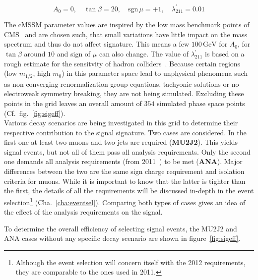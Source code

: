 \begin{equation*}
  A_0 = 0, \quad \tan{\beta} = 20, \quad \text{sgn}\,\mu = +1, \quad \lambda^\prime_{211} = 0.01
\end{equation*}

The cMSSM parameter values are inspired by the low mass benchmark points of CMS~\cite{cmssusybenchmarkpoints} and are chosen such, that small variations have little impact on the mass spectrum and thus do not affect signature. This means a few $100\,\text{GeV}$ for $A_0$, for $\tan{\beta}$ around $10$ and sign of $\mu$ can also change. The value of $\lambda^\prime_{211}$ is based on a rough estimate for the sensitvity of hadron colliders~\cite{rpvimpl}. Because certain regions (low $m_{1/2}$, high $m_0$) in this parameter space lead to unphysical phenomena such as non-converging renormalization group equations, tachyonic solutions or no electroweak symmetry breaking, they are not being simulated. Excluding these points in the grid leaves an overall amount of $354$ simulated phase space points (Cf.~fig.~\ref{fig:sigeff}). \\

Various decay scenarios are being investigated in this grid to determine their respective contribution to the signal signature. Two cases are considered. In the first one at least two muons and two jets are required (\textbf{MU2J2}). This yields signal events, but not all of them pass all analysis requirements. Only the second one demands all analysis requirements (from 2011~\cite{2011rpv}) to be met (\textbf{ANA}). Major differences between the two are the same sign charge requirement and isolation criteria for muons. While it is important to know that the latter is tighter than the first, the details of all the requirements will be discussed in-depth in the event selection\footnote{Although the event selection will concern itself with the 2012 requirements, they are comparable to the ones used in 2011.} (Cha.~\ref{cha:eventsel}). Comparing both types of cases gives an idea of the effect of the analysis requirements on the signal.

To determine the overall efficiency of selecting signal events, the MU2J2 and ANA cases without any specific decay scenario are shown in figure~\ref{fig:sigeff}.

